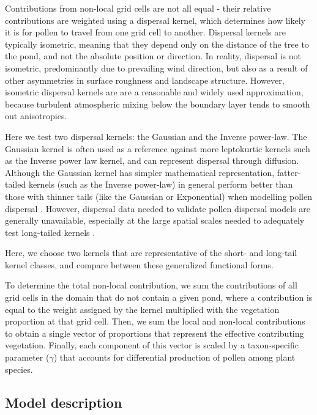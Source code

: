 \documentclass[12pt]{article}
\begin{document}
Contributions from non-local grid cells are not all equal - their
relative contributions are weighted using a dispersal kernel, which
determines how likely it is for pollen to travel from one grid cell to
another. Dispersal kernels are typically isometric, meaning that they
depend only on the distance of the tree to the pond, and not the
absolute position or direction. In reality, dispersal is not
isometric, predominantly due to prevailing wind direction, but also as
a result of other asymmetries in surface roughness and landscape
structure. However, isometric dispersal kernels are are a reasonable
and widely used approximation, because turbulent atmospheric mixing
below the boundary layer tends to smooth out anisotropies.

Here we test two dispersal kernels: the Gaussian and the Inverse
power-law. The Gaussian kernel is often used as a reference against
more leptokurtic kernels such as the Inverse power law kernel, and can
represent dispersal through diffusion. Although the Gaussian kernel
has simpler mathematical representation, fatter-tailed kernels (such
as the Inverse power-law) in general perform better than those with
thinner tails (like the Gaussian or Exponential) when modelling pollen
dispersal \citep{devaux2007modelling, austerlitz2004using}. However,
dispersal data needed to validate pollen dispersal models are
generally unavailable, especially at the large spatial scales needed
to adequately test long-tailed kernels \citep{clobert2012dispersal}.

Here, we choose two kernels that are representative of the short- and
long-tail kernel classes, and compare between these generalized
functional forms.


To determine the total non-local contribution, we sum the
contributions of all grid cells in the domain that do not contain a
given pond, where a contribution is equal to the weight assigned by
the kernel multiplied with the vegetation proportion at that grid
cell. Then, we sum the local and non-local contributions to obtain a
single vector of proportions that represent the effective contributing
vegetation. Finally, each component of this vector is scaled by a
taxon-specific parameter ($\gamma$) that accounts for differential
production of pollen among plant species.

\subsection{Model description}
\end{document}
